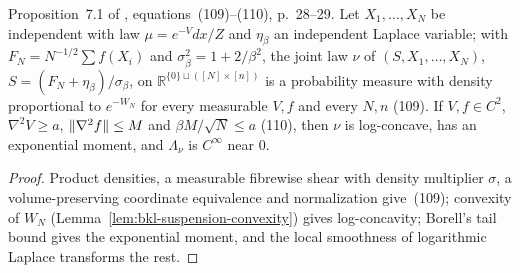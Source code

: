 \begin{lemma}
  \label{lem:bkl-suspension-law}
  \leanok
  Proposition~7.1 of \cite{BizeulKlartagLehec2026}, equations~(109)--(110), p.~28--29. Let
  $X_1,\dots,X_N$ be independent with law $\mu=e^{-V}dx/Z$ and $\eta_\beta$ an independent
  Laplace variable; with $F_N=N^{-1/2}\sum f(X_i)$ and $\sigma_\beta^2=1+2/\beta^2$, the joint law
  $\nu$ of $(S,X_1,\dots,X_N)$, $S=(F_N+\eta_\beta)/\sigma_\beta$, on
  $\mathbb R^{\{0\}\sqcup([N]\times[n])}$ is a probability measure with density proportional to
  $e^{-W_N}$ for every measurable $V,f$ and every $N,n$ (109). If $V,f\in C^2$,
  $\nabla^2V\ge a$, $\lVert\nabla^2f\rVert\le M$ and $\beta M/\sqrt N\le a$ (110), then $\nu$ is
  log-concave, has an exponential moment, and $\Lambda_\nu$ is $C^\infty$ near $0$.
\end{lemma}
\begin{proof}
  \leanok
  Product densities, a measurable fibrewise shear with density multiplier $\sigma$, a
  volume-preserving coordinate equivalence and normalization give~(109); convexity of $W_N$
  (Lemma~\ref{lem:bkl-suspension-convexity}) gives log-concavity; Borell's tail bound gives the
  exponential moment, and the local smoothness of logarithmic Laplace transforms the rest.
\end{proof}


